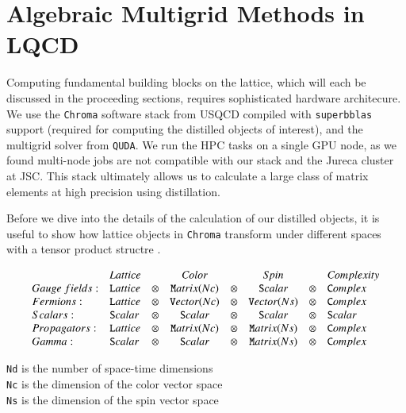 \section{Algebraic Multigrid Methods in LQCD}
Computing fundamental building blocks on the lattice, which will each be discussed in the proceeding sections, requires sophisticated hardware architecure. We use the \verb|Chroma| software stack from USQCD \cite{Edwards_2005} compiled with \verb|superbblas| support (required for computing the distilled objects of interest), and the multigrid solver from \verb|QUDA|. We run the HPC tasks on a single GPU node, as we found multi-node jobs are not compatible with our stack and the Jureca cluster at JSC. This stack ultimately allows us to calculate a large class of matrix elements at high precision \cite{romero_efficient_2020} using distillation. 

Before we dive into the details of the calculation of our distilled objects, it is useful to show how lattice objects in \texttt{Chroma} transform under different spaces with a tensor product structre \cite{Edwards_2005}. 

\begin{displaymath}
  \begin{array}{llcccccl}
                    & {\textit Lattice} &    &  {\textit Color} &     & {\textit Spin}  &     & {\textit Complexity}\\
  {Gauge\ fields:}& {\texttt Lattice} &\otimes& {\texttt Matrix(Nc)}&\otimes& {\texttt Scalar}    &\otimes& {\texttt Complex}\\
  {Fermions:}    & {\texttt Lattice} &\otimes& {\texttt Vector(Nc)}&\otimes& {\texttt Vector(Ns)}&\otimes& {\texttt Complex}\\
  {Scalars:}     & {\texttt Scalar}  &\otimes& {\texttt Scalar}    &\otimes& {\texttt Scalar}    &\otimes& {\texttt Scalar} \\
  {Propagators:} & {\texttt Lattice} &\otimes& {\texttt Matrix(Nc)}&\otimes& {\texttt Matrix(Ns)}&\otimes& {\texttt Complex}\\
  {Gamma:}       & {\texttt Scalar}  &\otimes& {\texttt Scalar}    &\otimes& {\texttt Matrix(Ns)}&\otimes& {\texttt Complex}\\
  \end{array}
  \end{displaymath}
  
  \verb|Nd| is the number of space-time dimensions\\
  \noindent
  \verb|Nc| is the dimension of the color vector space\\
  \noindent
  \verb|Ns| is the dimension of the spin vector space\\
  
